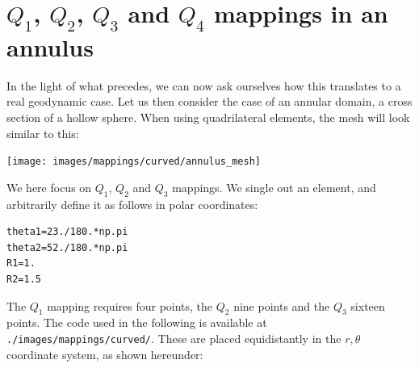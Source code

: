 \newpage
\section{$Q_1$, $Q_2$, $Q_3$ and $Q_4$ mappings in an annulus }

In the light of what precedes, we can now ask ourselves how this translates to 
a real geodynamic case. Let us then consider the case of an annular domain, 
a cross section of a hollow sphere. 
When using quadrilateral elements, the mesh will look similar to this:

\begin{center}
\texttt{[image: images/mappings/curved/annulus\_mesh]}
\end{center}

We here focus on $Q_1$, $Q_2$ and $Q_3$ mappings. We single out an element, 
and arbitrarily define it as follows in polar coordinates:
\begin{lstlisting}
theta1=23./180.*np.pi
theta2=52./180.*np.pi
R1=1.
R2=1.5
\end{lstlisting}
The $Q_1$ mapping requires four points, the $Q_2$ nine points and the $Q_3$
sixteen points. 
The code used in the following is available at {\tt ./images/mappings/curved/}.
These are placed equidistantly in the $r,\theta$ coordinate
system, as shown hereunder:

